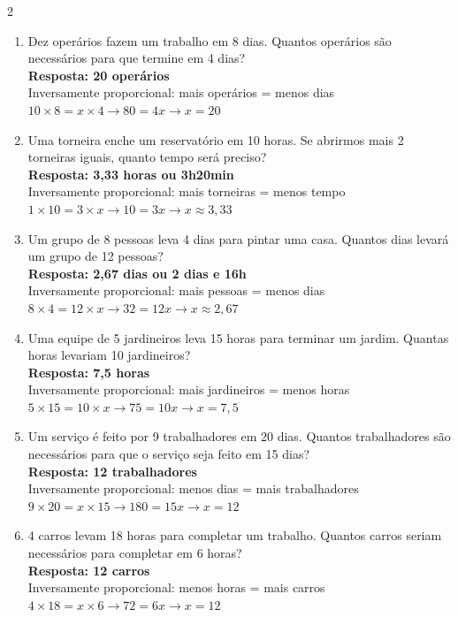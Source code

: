 \documentclass[11pt]{article}
\begin{document}
\begin{multicols}{2}
\begin{enumerate}[leftmargin=*, itemsep=15pt]
\item Dez operários fazem um trabalho em 8 dias. Quantos operários são necessários para que termine em 4 dias? \\
\textbf{Resposta: 20 operários} \\
Inversamente proporcional: mais operários = menos dias \\
$10 \times 8 = x \times 4 \rightarrow 80 = 4x \rightarrow x = 20$

\item Uma torneira enche um reservatório em 10 horas. Se abrirmos mais 2 torneiras iguais, quanto tempo será preciso? \\
\textbf{Resposta: 3,33 horas ou 3h20min} \\
Inversamente proporcional: mais torneiras = menos tempo \\
$1 \times 10 = 3 \times x \rightarrow 10 = 3x \rightarrow x \approx 3,33$

\item Um grupo de 8 pessoas leva 4 dias para pintar uma casa. Quantos dias levará um grupo de 12 pessoas? \\
\textbf{Resposta: 2,67 dias ou 2 dias e 16h} \\
Inversamente proporcional: mais pessoas = menos dias \\
$8 \times 4 = 12 \times x \rightarrow 32 = 12x \rightarrow x \approx 2,67$

\item Uma equipe de 5 jardineiros leva 15 horas para terminar um jardim. Quantas horas levariam 10 jardineiros? \\
\textbf{Resposta: 7,5 horas} \\
Inversamente proporcional: mais jardineiros = menos horas \\
$5 \times 15 = 10 \times x \rightarrow 75 = 10x \rightarrow x = 7,5$

\item Um serviço é feito por 9 trabalhadores em 20 dias. Quantos trabalhadores são necessários para que o serviço seja feito em 15 dias? \\
\textbf{Resposta: 12 trabalhadores} \\
Inversamente proporcional: menos dias = mais trabalhadores \\
$9 \times 20 = x \times 15 \rightarrow 180 = 15x \rightarrow x = 12$

\item 4 carros levam 18 horas para completar um trabalho. Quantos carros seriam necessários para completar em 6 horas? \\
\textbf{Resposta: 12 carros} \\
Inversamente proporcional: menos horas = mais carros \\
$4 \times 18 = x \times 6 \rightarrow 72 = 6x \rightarrow x = 12$


\end{enumerate}
\end{multicols}
\end{document}
